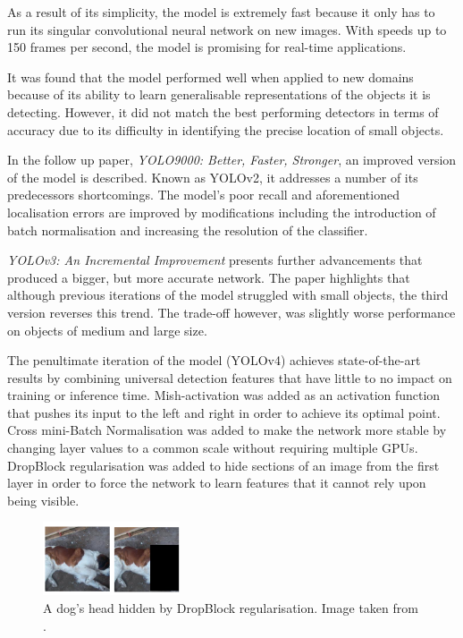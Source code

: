 \documentclass{thesis}
\begin{document}
As a result of its simplicity, the model is extremely fast because it only has to run its singular convolutional neural network on new images. With speeds up to 150 frames per second\cite{yolov1}, the model is promising for real-time applications.

It was found that the model performed well when applied to new domains because of its ability to learn generalisable representations of the objects it is detecting. However, it did not match the best performing detectors in terms of accuracy due to its difficulty in identifying the precise location of small objects.

In the follow up paper, \textit{YOLO9000: Better, Faster, Stronger}, an improved version of the model is described. Known as YOLOv2, it addresses a number of its predecessors shortcomings. The model's poor recall and aforementioned localisation errors are improved by modifications including the introduction of batch normalisation and increasing the resolution of the classifier\cite{yolo2}.

\textit{YOLOv3: An Incremental Improvement} presents further advancements that produced a bigger, but more accurate network. The paper highlights that although previous iterations of the model struggled with small objects, the third version reverses this trend. The trade-off however, was slightly worse performance on objects of medium and large size\cite{yolo3}.

The penultimate iteration of the model (YOLOv4) achieves state-of-the-art results by combining universal detection features that have little to no impact on training or inference time\cite{yolov4}. Mish-activation was added as an activation function that pushes its input to the left and right in order to achieve its optimal point. Cross mini-Batch Normalisation was added to make the network more stable by changing layer values to a common scale without requiring multiple GPUs. DropBlock regularisation was added to hide sections of an image from the first layer in order to force the network to learn features that it cannot rely upon being visible.

\begin{figure}[h]
    \centering
    \includegraphics[scale=1]{images/dropblock.png}
    \caption{A dog's head hidden by DropBlock regularisation. Image taken from \cite{cutmix}.}
    \label{fig:dropblock}
\end{figure}
\end{document}
